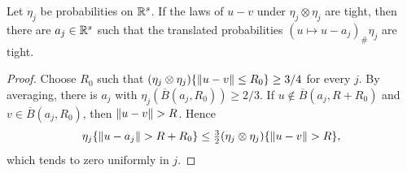 \begin{lemma}\label{lem:pair-tightness}
Let $\eta_j$ be probabilities on $\mathbb{R}^s$. If the laws of $u-v$ under $\eta_j\otimes\eta_j$ are tight, then there are $a_j\in\mathbb{R}^s$ such that the translated probabilities $(u\mapsto u-a_j)_\#\eta_j$ are tight.
\end{lemma}
\begin{proof}
Choose $R_0$ such that $(\eta_j\otimes\eta_j)\{\left\lVert u-v\right\rVert\leq R_0\}\geq3/4$ for every $j$. By averaging, there is $a_j$ with $\eta_j(\overline B(a_j,R_0))\geq2/3$. If $u\notin\overline B(a_j,R+R_0)$ and $v\in\overline B(a_j,R_0)$, then $\left\lVert u-v\right\rVert>R$. Hence
\begin{align}
\eta_j\{\left\lVert u-a_j\right\rVert>R+R_0\}
\leq\tfrac32(\eta_j\otimes\eta_j)\{\left\lVert u-v\right\rVert>R\},
\end{align}
which tends to zero uniformly in $j$.
\end{proof}

